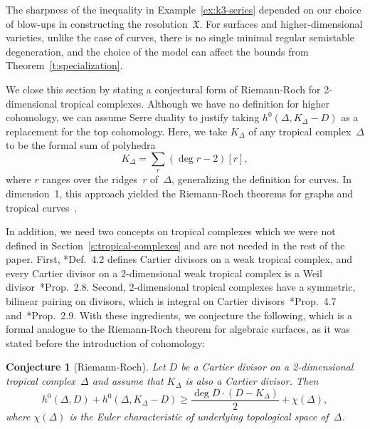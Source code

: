 \documentclass[11pt]{amsart}
\newtheorem{conj}[thm]{Conjecture}
\theoremstyle{definition}
\newcommand{\degree}{\operatorname{deg}}
\newcommand{\X}{\mathfrak X}
\begin{document}
The sharpness of the inequality in Example~\ref{ex:k3-series} depended on our
choice of blow-ups in constructing the resolution~$\X$. For surfaces and
higher-dimensional varieties, unlike the case of curves, there is no single
minimal regular semistable degeneration, and the choice of the model can affect
the bounds from Theorem~\ref{t:specialization}.

We close this section by stating a conjectural form of Riemann-Roch for
2-dimensional tropical complexes. Although we have no definition for higher
cohomology, we can assume Serre duality to justify taking $h^0(\Delta, K_\Delta
- D)$ as a replacement for the top cohomology. Here, we take $K_\Delta$ of any
tropical complex~$\Delta$ to be the formal sum of polyhedra
\begin{equation*}
K_\Delta = \sum_{r} (\degree r - 2)[r],
\end{equation*}
where $r$ ranges over
the ridges~$r$ of~$\Delta$, generalizing the definition for curves. In
dimension~1, this approach yielded the Riemann-Roch theorems for graphs and
tropical curves~\cites{baker-norine,gathmann-kerber,mikhalkin-zharkov}.

In addition, we need two concepts on tropical complexes which we were not
defined in Section~\ref{s:tropical-complexes} and are not needed in the rest of
the paper. First, \cite{cartwright-complexes}*{Def.~4.2} defines Cartier
divisors on a weak tropical complex, and every Cartier divisor on a
2-dimensional weak tropical complex is a Weil
divisor~\cite{cartwright-surfaces}*{Prop.~2.8}. Second, 2-dimensional tropical
complexes have a symmetric, bilinear pairing on divisors, which is integral on
Cartier divisors~\cite{cartwright-complexes}*{Prop.~4.7}
and~\cite{cartwright-surfaces}*{Prop.~2.9}. With these ingredients, we
conjecture the following, which is a formal analogue to the Riemann-Roch theorem
for algebraic surfaces, as it was stated before the introduction of cohomology:

\begin{conj}[Riemann-Roch]\label{conj:riemann-roch}
Let $D$ be a Cartier divisor on a 2-dimensional tropical complex~$\Delta$ and
assume that $K_\Delta$ is also a Cartier divisor. Then
\begin{equation}\label{eq:r-r}
h^0(\Delta, D) + h^0(\Delta, K_\Delta - D) \geq
\frac{\degree D \cdot (D - K_\Delta)}{2} + \chi(\Delta),
\end{equation}
where $\chi(\Delta)$ is the Euler characteristic of underlying topological space
of~$\Delta$.
\end{conj}
\end{document}
